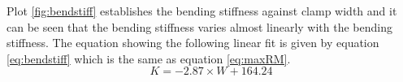 Plot \ref{fig:bendstiff} establishes the bending stiffness against clamp width and it can be seen that the bending stiffness varies almost linearly with the bending stiffness. The equation showing the following linear fit is given by equation \ref{eq:bendstiff} which is the same as equation \ref{eq:maxRM}. 
\begin{equation}
     K=-2.87\times W+ 164.24
     \label{eq:bendstiff}
 \end{equation}
 